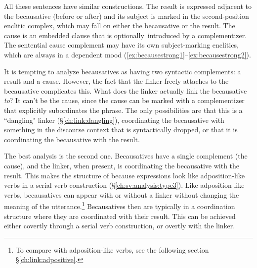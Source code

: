 All these sentences have similar constructions. The result is expressed adjacent to the becausative (before or after) and its subject is marked in the second-position enclitic complex, which may fall on either the becausative or the result. The cause is an embedded clause that is optionally introduced by a complementizer. The sentential cause complement may have its own subject-marking enclitics, which are always in a dependent mood (\ref{ex:becausestrong1}--\ref{ex:becausestrong2}).

It is tempting to analyze becausatives as having two syntactic complements: a result and a cause. However, the fact that the linker freely attaches to the becausative complicates this. What does the linker actually link the becausative \textit{to}? It can't be the cause, since the cause can be marked with a complementizer that explicitly subordinates the phrase. The only possibilities are that this is a ``dangling" linker (\S\ref{ch:link:dangling}), coordinating the becausative with something in the discourse context that is syntactically dropped, or that it is coordinating the becausative with the result.

The best analysis is the second one. Becausatives have a single complement (the cause), and the linker, when present, is coordinating the becausative with the result. This makes the structure of because expressions look like adposition-like verbs in a serial verb construction (\S\ref{ch:sv:analysis:type3}). Like adposition-like verbs, becausatives can appear with or without a linker without changing the meaning of the utterance.\footnote{To compare with adposition-like verbs, see the following section \S\ref{ch:link:adpositive}.} Becausatives then are typically in a coordination structure where they are coordinated with their result. This can be achieved either covertly through a serial verb construction, or overtly with the linker.


